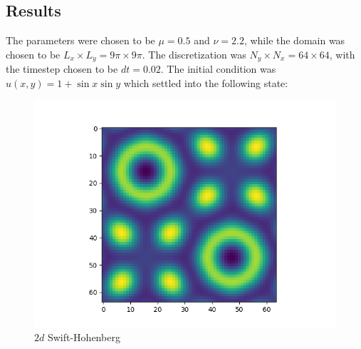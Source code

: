 \documentclass{article}
\begin{document}
\subsection{Results}
The parameters were chosen to be $\mu = 0.5$ and $\nu = 2.2$, while the domain was chosen to be $L_{x} \times L_{y} = 9\pi \times 9\pi$. 
The discretization was $ N_{y} \times N_{x} = 64 \times 64$, with the timestep chosen to be $dt = 0.02$. The initial condition was $u(x, y) = 1 + \sin{x}\sin{y}$ which settled into the following state: 
\begin{figure}[H]
        \centering
        \includegraphics[scale = 0.6]{Figs/u40000.png}
            \caption{$2d$ Swift-Hohenberg}
        \label{fig:2d_heat_test}
\end{figure}




 \if@openright\cleardoublepage\else\clearpage\fi
 \cleardoublepage
 \pagestyle{empty}
\end{document}

